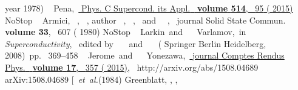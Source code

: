 \documentclass[prb,twocolumn,showpacs,preprintnumbers,amsmath,amssymb,floatfix,groupedaddress,superscriptaddress,aps,10pt]{revtex4-1}
\begin{document}
{{\begin{thebibliography}{93}
{		{year} {1978})}%
	\BibitemOpen
	 { {~\bibnamefont
			{Pena}},\ }\href {\doibase 10.1016/j.physc.2015.02.019} {
		{ {Phys. C Supercond. its Appl.}\ }\textbf {\bibinfo
			{volume} {514}},\  {95} ( {2015})}\BibitemShut
	{NoStop}%
	\BibitemOpen
	 { {\ \bibnamefont
			{Armici}},  {~},
		 {~}, \bibinfo
		{author} {~}, 
		{~}, \ and\ 
		{~},\ }\href@noop {} {\bibfield
		{journal} { {Solid State Commun.}\ }\textbf {\bibinfo
			{volume} {33}},\  {607} ( {1980})}\BibitemShut
	{NoStop}%
	\BibitemOpen
	 { {\ \bibnamefont
			{Larkin}}\ and\  {\ \bibnamefont
			{Varlamov}},\ }in\ \href@noop {} {\emph {
			{Superconductivity}}},\  {edited by\ 
		{~}\ and\ 
		{~}}\ (
	{Springer Berlin Heidelberg},\  {2008})\ pp.\ 
	{369--458}%
	\BibitemOpen
	 { {~\bibnamefont
			{Jerome}}\ and\  {~\bibnamefont
			{Yonezawa}},\ }\href {\doibase 10.1016/j.crhy.2015.12.003} {\bibfield
		{journal} { {Comptes Rendus Phys.}\ }\textbf {\bibinfo
			{volume} {17}},\  {357} ( {2015})},\ \Eprint
	{http://arxiv.org/abs/1508.04689} {arXiv:1508.04689} %
	\bibitem [{\ \emph {et~al.}(1984)\citenamefont
		{Greenblatt}, , ,
}
\end{thebibliography}}}
\end{document}

